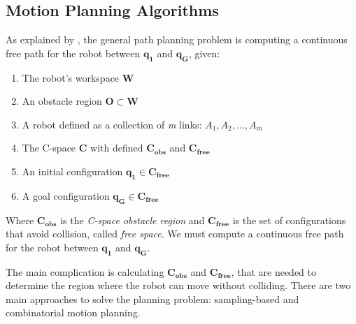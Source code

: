 

\subsection{Motion Planning Algorithms}

As explained by \citet{Handbook}, the general path planning problem is computing a continuous free path for the robot between $\bm{q_{1}}$ and $\bm{q_{G}}$, given:
\begin{enumerate}
	\vspace{-5pt}
	\item The robot's workspace $\bm{W}$
	\vspace{-5pt}
	\item An obstacle region $\bm{O} \subset \bm{W}$
	\vspace{-5pt}
	\item A robot defined as a collection of \textit{m} links: $A_{1}, A_{2}, ... , A_{m}$
	\vspace{-5pt}
	\item The C-space $\bm{C}$ with defined $\bm{C_{obs}}$ and $\bm{C_{free}}$
	\vspace{-5pt} 
	\item An initial configuration $\bm{q_{1}} \in  \bm{C_{free}}$
	\vspace{-5pt} 
	\item A goal configuration $\bm{q_{G}} \in  \bm{C_{free}}$
\end{enumerate}

Where $\bm{C_{obs}}$ is the \textit{C-space obstacle region} and $\bm{C_{free}}$ is the set of configurations that avoid collision, called \textit{free space}. We must compute a continuous free path for the robot between $\bm{q_{1}}$ and $\bm{q_{G}}$.

The main complication is calculating $\bm{C_{obs}}$ and $\bm{C_{free}}$, that are needed to determine the region where the robot can move without colliding. There are two main approaches to solve the planning problem: sampling-based and combinatorial motion planning.

